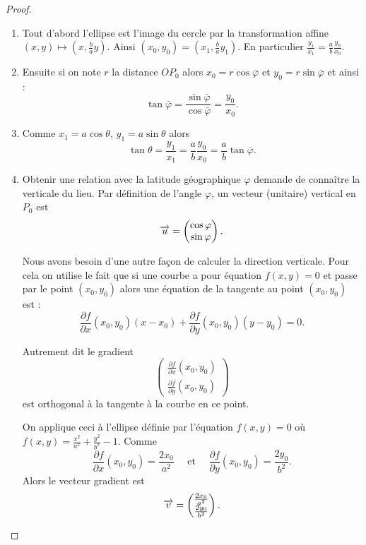 \documentclass[class=report,crop=false]{standalone}
\begin{document}
\begin{proof}
\begin{enumerate}
  \item Tout d'abord l'ellipse est l'image du cercle par la transformation affine 
  $(x,y) \mapsto (x,\frac{b}{a}y)$. Ainsi
  $(x_0,y_0) = (x_1,\frac{b}{a}y_1)$. En particulier 
  $\frac{y_1}{x_1}= \frac{a}{b}\frac{y_0}{x_0}$.


  \item Ensuite si on note $r$ la distance $OP_0$ alors
  $x_0 = r \cos \bar\varphi$ et $y_0 = r \sin \bar\varphi$ et ainsi :
  $$\tan \bar\varphi 
  = \frac{\sin \bar\varphi}{\cos \bar\varphi} 
  = \frac{y_0}{x_0}
  .$$
  
  \item Comme $x_1 = a \cos \theta$, $y_1 = a \sin \theta$ alors
  $$\tan \theta 
  = \frac{y_1}{x_1} 
  = \frac{a}{b}\frac{y_0}{x_0}
  = \frac{a}{b} \tan \bar\varphi.$$
  
  \item Obtenir une relation avec la latitude géographique $\varphi$ demande
  de connaître la verticale du lieu. Par définition de l'angle $\varphi$, 
  un vecteur (unitaire) vertical en $P_0$ est 
  $$ \overrightarrow{u} = \begin{pmatrix}\cos \varphi \\ \sin \varphi \end{pmatrix}.$$
  
  Nous avons besoin d'une autre façon de calculer la direction verticale.
  Pour cela on utilise le fait que si une courbe a pour équation
  $f(x,y)=0$ et passe par le point $(x_0,y_0)$ alors 
  une équation de la tangente au point $(x_0,y_0)$ est :
  $$\frac{\partial f}{\partial x}(x_0,y_0) (x-x_0) + \frac{\partial f}{\partial y}(x_0,y_0)(y-y_0) = 0.$$
  
  
  Autrement dit le gradient 
  $$\begin{pmatrix} \frac{\partial f}{\partial x}(x_0,y_0) \\ \frac{\partial f}{\partial y}(x_0,y_0) \end{pmatrix}$$
  est orthogonal à la tangente à la courbe en ce point.

  On applique ceci à l'ellipse définie par l'équation $f(x,y)=0$ où 
  $f(x,y) = \frac{x^2}{a^2}+\frac{y^2}{b^2} - 1$.
  Comme 
  $$\frac{\partial f}{\partial x}(x_0,y_0) = \frac{2x_0}{a^2}
  \quad \text{ et } \quad \frac{\partial f}{\partial y}(x_0,y_0) = \frac{2y_0}{b^2}.$$
  Alors le vecteur gradient est 
  $$\overrightarrow v = \begin{pmatrix}\frac{2x_0}{a^2} \\ \frac{2y_0}{b^2} \end{pmatrix}.$$
  


\end{enumerate}
\end{proof}
\end{document}
